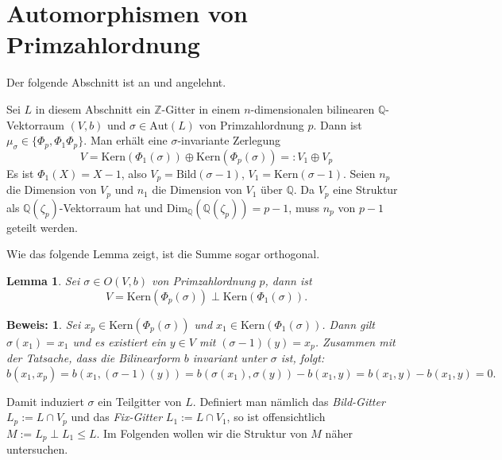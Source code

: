 \documentclass[12pt,a4paper,halfparskip,headsepline,bibtotocnumbered]{scrreprt}
\theoremstyle{nummermitklammern}
\newtheorem{lemma}[defsatzusw]{Lemma}
\theoremstyle{nonumberbreak}
\newtheorem{beweis}{Beweis:}
\newcommand{\Z}{\mathbb{Z}}
\newcommand{\Q}{\mathbb{Q}}
\newcommand{\Kern}{\text{Kern}}
\newcommand{\Bild}{\text{Bild}}
\newcommand{\Aut}{\text{Aut}}
\begin{document}
\section{Automorphismen von Primzahlordnung}
Der folgende Abschnitt ist an \cite[Kap. 4]{juergens} und \cite[Kap. 4]{nebe} angelehnt.\par
Sei $L$ in diesem Abschnitt ein $\Z$-Gitter in einem $n$-dimensionalen bilinearen $\Q$-Vektorraum $(V,b)$ und $\sigma \in \Aut(L)$ von Primzahlordnung $p$. Dann ist $\mu_\sigma \in \lbrace \Phi_p, \Phi_1 \Phi_p \rbrace$. Man erhält eine $\sigma$-invariante Zerlegung
\begin{equation*}
	V = \Kern(\Phi_1(\sigma)) \oplus \Kern(\Phi_p(\sigma)) =: V_1 \oplus V_p
\end{equation*}
Es ist $\Phi_1(X) = X-1$, also $V_p = \Bild(\sigma - 1)$, $V_1 = \Kern(\sigma - 1)$. Seien $n_p$ die Dimension von $V_p$ und $n_1$ die Dimension von $V_1$ über $\Q$. Da $V_p$ eine Struktur als $\Q(\zeta_p)$-Vektorraum hat und $\text{Dim}_\Q(\Q(\zeta_p)) = p-1$, muss $n_p$ von $p-1$ geteilt werden.\par
Wie das folgende Lemma zeigt, ist die Summe sogar orthogonal.

\begin{framed}
	\begin{lemma}
		Sei $\sigma \in O(V,b)$ von Primzahlordnung $p$, dann ist
		\begin{equation*}
			V = \Kern(\Phi_p(\sigma)) \perp \Kern(\Phi_1(\sigma)).
		\end{equation*}
	\end{lemma}
\end{framed}

\begin{beweis}
	Sei $x_p \in \Kern(\Phi_p(\sigma))$ und $x_1 \in \Kern(\Phi_1(\sigma))$. Dann gilt $\sigma(x_1) = x_1$ und es existiert ein $y \in V$ mit $(\sigma - 1)(y) = x_p$. Zusammen mit der Tatsache, dass die Bilinearform $b$ invariant unter $\sigma$ ist, folgt:
	\begin{equation*}
		b(x_1, x_p) = b(x_1, (\sigma-1)(y)) = b(\sigma(x_1), \sigma(y)) - b(x_1, y) = b(x_1, y) - b(x_1, y) = 0.
	\end{equation*}
\end{beweis}

Damit induziert $\sigma$ ein Teilgitter von $L$. Definiert man nämlich das \textit{Bild-Gitter} $L_p := L \cap V_p$ und das \textit{Fix-Gitter} $L_1 := L \cap V_1$, so ist offensichtlich $M := L_p \perp L_1 \leq L$. Im Folgenden wollen wir die Struktur von $M$ näher untersuchen.
\end{document}
